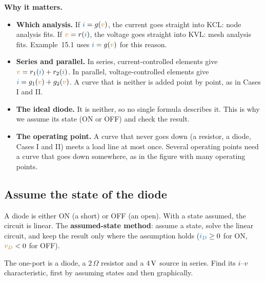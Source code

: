 \documentclass[11pt,a4paper]{article}
\newcommand{\Icol}[1]{\textcolor{ccur}{#1}}
\newcommand{\Vcol}[1]{\textcolor{cvolt}{#1}}
\newcommand{\ohm}{\,\Omega}
\newcommand{\exS}[2][4]{%
  \draw (-0.7,4.4) -- (1.0,4.4) -- (1.0,4.0);
  \ifcase#2
    \draw (1.0,4.0) to[D*] (1.0,2.8);
  \or
    \draw (1.0,4.0) -- (1.0,2.8);
    \node[font=\scriptsize, text=metured, anchor=west] at (1.15,3.4) {ON};
  \or
    \draw (1.0,4.0) -- (1.0,3.75); \draw (1.0,2.8) -- (1.0,3.05);
    \draw (1.0,3.75) node[ocirc] {}; \draw (1.0,3.05) node[ocirc] {};
    \node[pol] at (0.75,3.62) {$+$}; \node[pol] at (0.75,3.18) {$-$};
    \node[font=\small, text=cvolt, anchor=east] at (0.62,3.4) {$v_D$};
    \node[font=\scriptsize, text=metured, anchor=west] at (1.15,3.4) {OFF};
  \fi
  \draw (1.0,2.8) to[R] (1.0,1.5);
  \node[font=\small, anchor=west] at (1.2,2.15) {$2\ohm$};
  \draw (1.0,1.5) to[american voltage source, l=$\Vcol{#1\V}$] (1.0,0.3) -- (1.0,0) -- (-0.7,0);
  \draw (-0.7,4.4) node[ocirc] {}; \draw (-0.7,0) node[ocirc] {};
  \draw[iar] (-0.6,4.75) -- (0.0,4.75); \node[font=\small, text=ccur] at (-0.3,5.05) {$i$};
  \node[pol] at (-1.0,4.0) {$+$}; \node[pol] at (-1.0,0.4) {$-$};
  \node[font=\small, text=cvolt] at (-1.05,2.2) {$v$};}
\begin{document}
\noindent\textbf{Why it matters.}
\begin{itemize}[itemsep=3pt]
  \item \textbf{Which analysis.} If $\Icol{i} = g(\Vcol{v})$, the current goes straight into KCL:
        node analysis fits. If $\Vcol{v} = r(\Icol{i})$, the voltage goes straight into KVL: mesh
        analysis fits. Example~15.1 uses $\Icol{i} = g(\Vcol{v})$ for this reason.
  \item \textbf{Series and parallel.} In series, current-controlled elements give
        $\Vcol{v} = r_1(\Icol{i}) + r_2(\Icol{i})$. In parallel, voltage-controlled elements give
        $\Icol{i} = g_1(\Vcol{v}) + g_2(\Vcol{v})$. A curve that is neither is added point by point,
        as in Cases I and II.
  \item \textbf{The ideal diode.} It is neither, so no single formula describes it. This is why
        we assume its state (ON or OFF) and check the result.
  \item \textbf{The operating point.} A curve that never goes down (a resistor, a diode, Cases I
        and II) meets a load line at most once. Several operating points need a curve that goes
        down somewhere, as in the figure with many operating points.
\end{itemize}

\subsection{Assume the state of the diode}

A diode is either ON (a short) or OFF (an open). With a state assumed, the circuit is linear.
The \textbf{assumed-state method}: assume a state, solve the linear circuit, and keep the result
only where the assumption holds ($\Icol{i_D} \geq 0$ for ON, $\Vcol{v_D} < 0$ for OFF).

\bigskip
\begin{examplebox}
\begin{minipage}[c]{0.36\linewidth}
\centering
{}
\end{minipage}\hfill
\begin{minipage}[c]{0.6\linewidth}
The one-port is a diode, a $2\ohm$ resistor and a $4\,\mathrm{V}$ source in series. Find its $i$--$v$
characteristic, first by assuming states and then graphically.
\end{minipage}
\end{examplebox}
\end{document}
